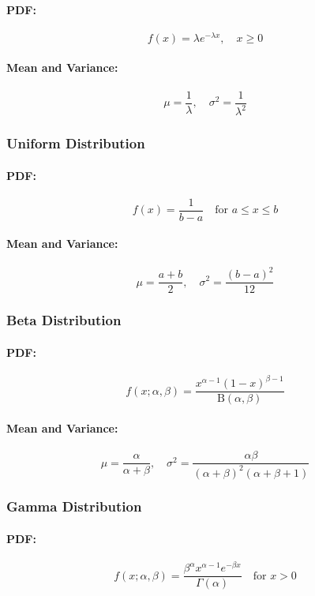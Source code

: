 \documentclass[8pt, a4paper, landscape, includeheadfoot]{extarticle}
\begin{document}
\begin{multicols*}{4}
	\paragraph{PDF:}
	$$
		f(x) = \lambda e^{-\lambda x}, \quad x \geq 0
	$$
	\paragraph{Mean and Variance:}
	$$
		\mu = \frac{1}{\lambda}, \quad \sigma^2 = \frac{1}{\lambda^2}
	$$

	\subsubsection{Uniform Distribution}{}
	\paragraph{PDF:}
	$$
		f(x) = \frac{1}{b - a} \quad \text{for } a \leq x \leq b
	$$
	\paragraph{Mean and Variance:}
	$$
		\mu = \frac{a + b}{2}, \quad \sigma^2 = \frac{(b - a)^2}{12}
	$$

	\subsubsection{Beta Distribution}{}
	\paragraph{PDF:}
	$$
		f(x; \alpha, \beta) = \frac{x^{\alpha - 1} (1 - x)^{\beta - 1}}{\mathrm{B}(\alpha, \beta)}
	$$
	\paragraph{Mean and Variance:}
	$$
		\mu = \frac{\alpha}{\alpha + \beta}, \quad \sigma^2 = \frac{\alpha \beta}{(\alpha + \beta)^2 (\alpha + \beta + 1)}
	$$

	\subsubsection{Gamma Distribution}{}
	\paragraph{PDF:}
	$$
		f(x; \alpha, \beta) = \frac{\beta^\alpha x^{\alpha - 1} e^{-\beta x}}{\Gamma(\alpha)} \quad \text{for } x > 0
	$$

\end{multicols*}
\end{document}
